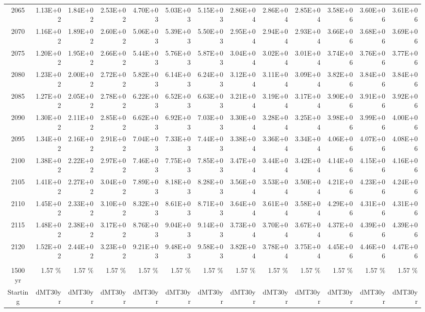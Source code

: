 \documentclass{article}
\begin{document}
\begin{table}
\begin{tabular}{crrr|rrr|rrr|rrr}
2065     & 1.13E+02 & 1.84E+02 & 2.53E+02 & 4.70E+03 & 5.03E+03 & 5.15E+03 & 2.86E+04 & 2.86E+04 & 2.85E+04 & 3.58E+06 & 3.60E+06 & 3.61E+06 \\
2070     & 1.16E+02 & 1.89E+02 & 2.60E+02 & 5.06E+03 & 5.39E+03 & 5.50E+03 & 2.95E+04 & 2.94E+04 & 2.93E+04 & 3.66E+06 & 3.68E+06 & 3.69E+06 \\
2075     & 1.20E+02 & 1.95E+02 & 2.66E+02 & 5.44E+03 & 5.76E+03 & 5.87E+03 & 3.04E+04 & 3.02E+04 & 3.01E+04 & 3.74E+06 & 3.76E+06 & 3.77E+06 \\
2080     & 1.23E+02 & 2.00E+02 & 2.72E+02 & 5.82E+03 & 6.14E+03 & 6.24E+03 & 3.12E+04 & 3.11E+04 & 3.09E+04 & 3.82E+06 & 3.84E+06 & 3.84E+06 \\
2085     & 1.27E+02 & 2.05E+02 & 2.78E+02 & 6.22E+03 & 6.52E+03 & 6.63E+03 & 3.21E+04 & 3.19E+04 & 3.17E+04 & 3.90E+06 & 3.91E+06 & 3.92E+06 \\
2090     & 1.30E+02 & 2.11E+02 & 2.85E+02 & 6.62E+03 & 6.92E+03 & 7.03E+03 & 3.30E+04 & 3.28E+04 & 3.25E+04 & 3.98E+06 & 3.99E+06 & 4.00E+06 \\
2095     & 1.34E+02 & 2.16E+02 & 2.91E+02 & 7.04E+03 & 7.33E+03 & 7.44E+03 & 3.38E+04 & 3.36E+04 & 3.34E+04 & 4.06E+06 & 4.07E+06 & 4.08E+06 \\
2100     & 1.38E+02 & 2.22E+02 & 2.97E+02 & 7.46E+03 & 7.75E+03 & 7.85E+03 & 3.47E+04 & 3.44E+04 & 3.42E+04 & 4.14E+06 & 4.15E+06 & 4.16E+06 \\
2105     & 1.41E+02 & 2.27E+02 & 3.04E+02 & 7.89E+03 & 8.18E+03 & 8.28E+03 & 3.56E+04 & 3.53E+04 & 3.50E+04 & 4.21E+06 & 4.23E+06 & 4.24E+06 \\
2110     & 1.45E+02 & 2.33E+02 & 3.10E+02 & 8.32E+03 & 8.61E+03 & 8.71E+03 & 3.64E+04 & 3.61E+04 & 3.58E+04 & 4.29E+06 & 4.31E+06 & 4.31E+06 \\
2115     & 1.48E+02 & 2.38E+02 & 3.17E+02 & 8.76E+03 & 9.04E+03 & 9.14E+03 & 3.73E+04 & 3.70E+04 & 3.67E+04 & 4.37E+06 & 4.39E+06 & 4.39E+06 \\
2120     & 1.52E+02 & 2.44E+02 & 3.23E+02 & 9.21E+03 & 9.48E+03 & 9.58E+03 & 3.82E+04 & 3.78E+04 & 3.75E+04 & 4.45E+06 & 4.46E+06 & 4.47E+06 \\
         &          &          &          &          &          &          &          &          &          &          &          &          \\ \hline
1500 yr  & 1.57 \%  & 1.57 \%  & 1.57 \%  & 1.57 \%  & 1.57 \%  & 1.57 \%  & 1.57 \%  & 1.57 \%  & 1.57 \%  & 1.57 \%  & 1.57 \%  & 1.57 \%  \\
Starting & dMT30yr  & dMT30yr  & dMT30yr  & dMT30yr  & dMT30yr  & dMT30yr  & dMT30yr  & dMT30yr  & dMT30yr  & dMT30yr  & dMT30yr  & dMT30yr  \\

\end{tabular}
\end{table}
\end{document}
